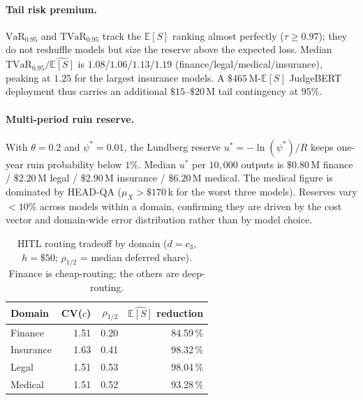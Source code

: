 \documentclass[11pt]{article}
\newcommand{\ES}{\mathbb{E}[S]}
\newcommand{\VaR}{\mathrm{VaR}}
\newcommand{\TVaR}{\mathrm{TVaR}}
\begin{document}
\paragraph{Tail risk premium.}
$\VaR_{0.95}$ and $\TVaR_{0.95}$ track the $\ES$ ranking almost
perfectly ($\tau\geq 0.97$); they do not reshuffle models but
size the reserve above the expected loss. Median
$\TVaR_{0.95}/\widehat{\ES}$ is $1.08$/$1.06$/$1.13$/$1.19$
(finance/legal/medical/insurance), peaking at $1.25$ for the
largest insurance models. A $\$465$\,M-$\ES$ JudgeBERT deployment
thus carries an additional $\$15$--$\$20$\,M tail contingency at
$95\%$.

\paragraph{Multi-period ruin reserve.}
With $\theta{=}0.2$ and $\psi^\ast{=}0.01$, the Lundberg reserve
$u^\ast = -\ln(\psi^\ast)/R$ keeps one-year ruin probability
below $1\%$. Median $u^\ast$ per $10{,}000$ outputs is
$\$0.80$\,M finance / $\$2.20$\,M legal / $\$2.90$\,M insurance /
$\$6.20$\,M medical. The medical figure is dominated by HEAD-QA
($\mu_X{>}\$170$\,k for the worst three models). Reserves vary
$<10\%$ across models within a domain, confirming they are
driven by the cost vector and domain-wide error distribution
rather than by model choice.

\begin{table}[t]\centering
\begin{tabular}{lrrr}
\toprule
Domain & CV($c$) & $\rho_{1/2}$ & $\widehat{\ES}$ reduction \\
\midrule
  Finance   & 1.51 & 0.20 & 84.59\,\% \\
  Insurance & 1.63 & 0.41 & 98.32\,\% \\
  Legal     & 1.51 & 0.53 & 98.04\,\% \\
  Medical   & 1.51 & 0.52 & 93.28\,\% \\
\bottomrule
\end{tabular}
\caption{HITL routing tradeoff by domain ($d{=}c_3$, $h{=}\$50$;
$\rho_{1/2}$ = median deferred share). Finance is cheap-routing;
the others are deep-routing.}
\label{tab:h4}
\vspace{-1em}
\end{table}
\end{document}
